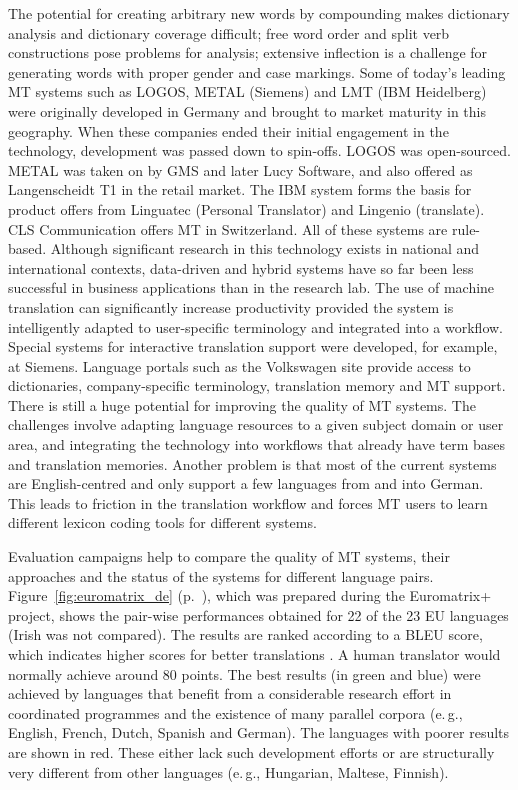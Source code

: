 \begin{multicols}{2}
The potential for creating arbitrary new words by compounding makes dictionary analysis and dictionary coverage difficult; free word order and split verb constructions pose problems for analysis; extensive inflection is a challenge for generating words with proper gender and case markings. Some of today's leading MT systems such as LOGOS, METAL (Siemens) and LMT (IBM Heidelberg) were originally developed in Germany and brought to market maturity in this geography. When these companies ended their initial engagement in the technology, development was passed down to spin-offs. LOGOS was open-sourced. METAL was taken on by GMS and later Lucy Software, and also offered as Langenscheidt T1 in the retail market. The IBM system forms the basis for product offers from Linguatec (Personal Translator) and Lingenio (translate). CLS Communication offers MT in Switzerland. All of these systems are rule-based. Although significant research in this technology exists in national and international contexts, data-driven and hybrid systems have so far been less successful in business applications than in the research lab. The use of machine translation can significantly increase productivity provided the system is intelligently adapted to user-specific terminology and integrated into a workflow. Special systems for interactive translation support were developed, for example, at Siemens. Language portals such as the Volkswagen site provide access to dictionaries, company-specific terminology, translation memory and MT support. There is still a huge potential for improving the quality of MT systems. The challenges involve adapting language resources to a given subject domain or user area, and integrating the technology into workflows that already have term bases and translation memories. Another problem is that most of the current systems are English-centred and only support a few languages from and into German. This leads to friction in the translation workflow and forces MT users to learn different lexicon coding tools for different systems.

Evaluation campaigns help to compare the quality of MT systems, their approaches and the status of the systems for different language pairs. Figure~\ref{fig:euromatrix_de} (p.~\pageref{fig:euromatrix_de}), which was prepared during the Euromatrix+ project, shows the pair-wise performances obtained for 22 of the 23 EU languages (Irish was not compared). The results are ranked according to a BLEU score, which indicates higher scores for better translations \cite{bleu1}. A human translator would normally achieve around 80 points. The best results (in green and blue) were achieved by languages that benefit from a considerable research effort in coordinated programmes and the existence of many parallel corpora (e.\,g., English, French, Dutch, Spanish and German). The languages with poorer results are shown in red. These either lack such development efforts or are structurally very different from other languages (e.\,g., Hungarian, Maltese, Finnish).


\end{multicols}
